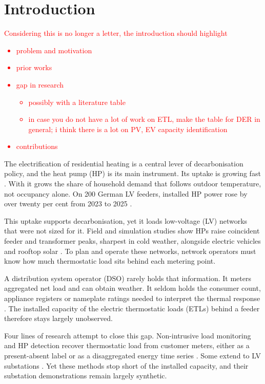\documentclass[9pt,journal,a4]{IEEEtran}
\begin{document}
\section{Introduction}
\label{sec:intro}
\textcolor{red}{Considering this is no longer a letter, the introduction should highlight 
\begin{itemize}
    \item problem and motivation
    \item prior works
    \item gap in research
    \begin{itemize}
        \item possibly with a literature table 
        \item in case you do not have a lot of work on ETL, make the table for DER in general; i think there is a lot on PV, EV capacity identification
    \end{itemize}
    \item contributions
\end{itemize}
}

The electrification of residential heating is a central lever of decarbonisation policy, and the heat pump (HP) is its main instrument. Its uptake is growing fast \cite{Iea22}. With it grows the share of household demand that follows outdoor temperature, not occupancy alone. On 200 German LV feeders, installed HP power rose by over twenty per cent from 2023 to 2025 \cite{Tre26}.

This uptake supports decarbonisation, yet it loads low-voltage (LV) networks that were not sized for it. Field and simulation studies show HPs raise coincident feeder and transformer peaks, sharpest in cold weather, alongside electric vehicles and rooftop solar \cite{Vel11, Akm14, Som21, Bec24, Lia26}. To plan and operate these networks, network operators must know how much thermostatic load sits behind each metering point.

A distribution system operator (DSO) rarely holds that information. It meters aggregated net load and can obtain weather. It seldom holds the consumer count, appliance registers or nameplate ratings needed to interpret the thermal response \cite{Gou26, Tre26}. The installed capacity of the electric thermostatic loads (ETLs) behind a feeder therefore stays largely unobserved.

Four lines of research attempt to close this gap. Non-intrusive load monitoring and HP detection recover thermostatic load from customer meters, either as a present-absent label \cite{Fei13, Wei20b, Ray19} or as a disaggregated energy time series \cite{Bru23, Gis26}. Some extend to LV substations \cite{Wan20, Oma24}. Yet these methods stop short of the installed capacity, and their substation demonstrations remain largely synthetic.
\end{document}
